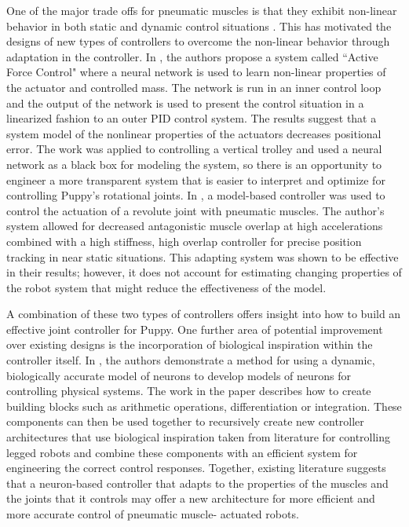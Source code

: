 One of the major trade offs for pneumatic muscles is that they exhibit
non-linear behavior in both static and dynamic control situations \cite{HuntPMuscles, DynamicPMuscles}. This has
motivated the designs of new types of controllers to overcome the non-linear
behavior through adaptation in the controller. In \cite{Jahanabadi2009}, the
authors propose a system called ``Active Force Control" where a neural network
is used to learn non-linear properties of the actuator and controlled mass.
The network is run in an inner control loop and the output of the network is
used to present the control situation in a linearized fashion to an outer PID
control system. The results suggest that a system model of the nonlinear
properties of the actuators decreases positional error. The work was
applied to controlling a vertical trolley and used a neural network as a black
box for modeling the system, so there is an opportunity to engineer a more transparent system that is easier to interpret and optimize for controlling Puppy's rotational joints.
In \cite{Wang2013}, a model-based controller was used to control the actuation
of a revolute joint with pneumatic muscles. The author's system allowed for
decreased antagonistic muscle overlap at high accelerations combined with a
high stiffness, high overlap controller for precise position tracking in near
static situations. This adapting system was shown to be effective in their
results; however, it does not account for estimating changing properties of the
robot system that might reduce the effectiveness of the model.

A combination of these two types of controllers offers insight into how to build
an effective joint controller for Puppy. One further area of potential
improvement over existing designs is the incorporation of biological inspiration
within the controller itself. In \cite{NickFunctionalSubnetwork}, the authors
demonstrate a method for using a dynamic, biologically accurate model of neurons
to develop models of neurons for controlling physical systems. The work in the
paper describes how to create building blocks such as arithmetic operations,
differentiation or integration. These components can then be used together to
recursively create new controller architectures that use biological inspiration
taken from literature for controlling legged robots and combine these components with an
efficient system for engineering the correct control responses. Together,
existing literature suggests that a neuron-based controller that adapts to the
properties of the muscles and the joints that it controls may offer a new
architecture for more efficient and more accurate control of pneumatic muscle-
actuated robots.

